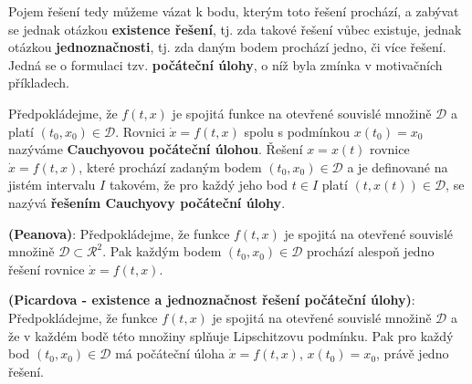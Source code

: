       Pojem řešení tedy můžeme vázat k bodu, kterým toto řešení prochází, a zabývat se jednak
      otázkou \textbf{existence řešení}, tj. zda takové řešení vůbec existuje, jednak otázkou
      \textbf{jednoznačnosti}, tj. zda daným bodem prochází jedno, či více řešení. Jedná se o
      formulaci tzv. \textbf{počáteční úlohy}, o níž byla zmínka v motivačních příkladech.

      \begin{mdframed}[style=mdnote] 
        Předpokládejme, že \(f(t, x)\) je spojitá funkce na otevřené souvislé množině
        \(\mathcal{D}\) a platí \((t_0, x_0) \in \mathcal{D}\). Rovnici \(\dot{x} = f(t, x)\) spolu
        s podmínkou \(x(t_0) = x_0\) nazýváme \textbf{Cauchyovou počáteční úlohou}. Řešení \(x =
        x(t)\) rovnice \(\dot{x} = f(t, x)\), které prochází zadaným bodem \((t_0, x_0) \in
        \mathcal{D}\) a je definované na jistém intervalu \(I\) takovém, že pro každý jeho bod
        \(t\in I\) platí \((t, x(t)) \in \mathcal{D}\), se nazývá \textbf{řešením Cauchyovy
        počáteční úlohy}.
      \end{mdframed}






      \begin{mdframed}[style=mdmathdef]
        \begin{lemma}\label{mai:lemma006}
          \textbf{(Peanova)}: Předpokládejme, že funkce \(f(t, x)\) je spojitá na otevřené souvislé
          množině \(\mathcal{D} \subset \mathcal{R}^2\). Pak každým bodem \((t_0, x_0) \in
          \mathcal{D}\) prochází alespoň jedno řešení rovnice \(\dot{x} = f(t, x)\).
        \end{lemma}
      \end{mdframed} 




      \begin{mdframed}[style=mdmathdef]
        \begin{lemma}\label{mai:lemma007}
          \textbf{(Picardova - existence a jednoznačnost řešení počáteční úlohy)}: Předpokládejme,
          že funkce \(f(t, x)\) je spojitá na otevřené souvislé množině \(\mathcal{D}\) a že v
          každém bodě této množiny splňuje Lipschitzovu podmínku. Pak pro každý bod \((t_0, x_0) \in
          \mathcal{D}\) má počáteční úloha \(\dot{x} = f(t, x)\), \(x(t_0) = x_0\), právě jedno
          řešení.
        \end{lemma}
      \end{mdframed} 


